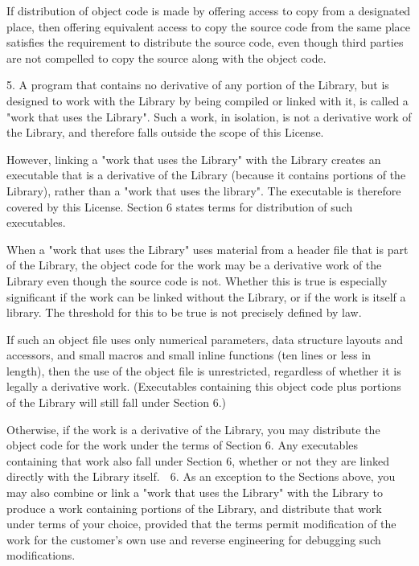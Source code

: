 \documentclass[a4paper,twoside,12pt]{book}
\begin{document}
  If distribution of object code is made by offering access to copy
from a designated place, then offering equivalent access to copy the
source code from the same place satisfies the requirement to
distribute the source code, even though third parties are not
compelled to copy the source along with the object code.

  5. A program that contains no derivative of any portion of the
Library, but is designed to work with the Library by being compiled or
linked with it, is called a "work that uses the Library".  Such a
work, in isolation, is not a derivative work of the Library, and
therefore falls outside the scope of this License.

  However, linking a "work that uses the Library" with the Library
creates an executable that is a derivative of the Library (because it
contains portions of the Library), rather than a "work that uses the
library".  The executable is therefore covered by this License.
Section 6 states terms for distribution of such executables.

  When a "work that uses the Library" uses material from a header file
that is part of the Library, the object code for the work may be a
derivative work of the Library even though the source code is not.
Whether this is true is especially significant if the work can be
linked without the Library, or if the work is itself a library.  The
threshold for this to be true is not precisely defined by law.

  If such an object file uses only numerical parameters, data
structure layouts and accessors, and small macros and small inline
functions (ten lines or less in length), then the use of the object
file is unrestricted, regardless of whether it is legally a derivative
work.  (Executables containing this object code plus portions of the
Library will still fall under Section 6.)

  Otherwise, if the work is a derivative of the Library, you may
distribute the object code for the work under the terms of Section 6.
Any executables containing that work also fall under Section 6,
whether or not they are linked directly with the Library itself.

  6. As an exception to the Sections above, you may also combine or
link a "work that uses the Library" with the Library to produce a
work containing portions of the Library, and distribute that work
under terms of your choice, provided that the terms permit
modification of the work for the customer's own use and reverse
engineering for debugging such modifications.
\end{document}
